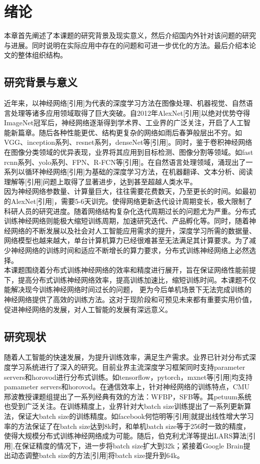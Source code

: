 \chapter{绪论}
本章首先阐述了本课题的研究背景及现实意义，然后介绍国内外针对该问题的研究与进展。同时说明在实际应用中存在的问题和可进一步优化的方法。最后介绍本论文的整体组织结构。
\section{研究背景与意义}
近年来，以神经网络[引用]为代表的深度学习方法在图像处理、机器视觉、自然语言处理等诸多应用领域取得了巨大突破。自2012年AlexNet[引用]以绝对优势夺得ImageNet冠军后，神经网络逐渐得到学术界、工业界的广泛关注，开启了人工智能新篇章。随后各种性能更优、结构更复杂的网络如雨后春笋般层出不穷。如VGG、inception系列、resnet系列，denseNet等[引用]。同时，鉴于卷积神经网络在图像分类领域的优异表现，业界将其应用到目标检测、图像分割等领域。如fast rcnn系列、yolo系列、FPN、R-FCN等[引用]。在自然语言处理领域，涌现出了一系列以循环神经网络[引用]为基础的深度学习方法，在机器翻译、文本分析、阅读理解等[引用]问题上取得了显著进步，达到甚至超越人类水平。\\
因为神经网络参数量、计算量巨大，往往需要花费数天，乃至更长的时间。如最初的AlexNet[引用]，需要5-6天训完。使得网络更新迭代设计周期变长，极大限制了科研人员的研究进度。随着网络结构复杂化迭代周期过长的问题尤为严重。分布式训练神经网络则能极大缩短训练周期，加速研究迭代、产品孵化等。同时，随着神经网络的不断发展以及社会对人工智能应用需求的提升，深度学习所需的数据量、网络模型也越来越大，单台计算机算力已经很难甚至无法满足其计算要求。为了减少神经网络的训练时间和适应不断增长的算力要求，分布式训练神经网络上必然选择。\\
本课题围绕着分布式训练神经网络的效率和精度进行展开，旨在保证网络性能前提下，提高分布式训练神经网络效率，提高训练加速比，缩短训练时间。本课题不仅能解决现今训练神经网络时间过长的问题， 更为今后单机场景下无法完成训练的神经网络提供了高效的训练方法。这对于现阶段和可预见未来都有重要实用价值，促进神经网络的发展，对人工智能的发展有深远意义。

\section{研究现状}
随着人工智能的快速发展，为提升训练效率，满足生产需求。业界已针对分布式深度学习系统进行了深入的研究。目前业界主流深度学习框架同时支持parameter servers和horovod进行分布式训练。如tensorflow，pytorch，mxnet等[引用]均支持pamameter servers和horovod。在通信效率上，针对神经网络的训练特点，CMU邢波教授课题组提出了一系列经典有效的方法：WFBP，SFB等。其petuum系统也受到广泛关注。在训练精度上，业界针对大batch size训练提出了一系列更新算法，保证大batch size的训练精度。如facebook何恺明等[引用]就提出线性增大学习率的方法保证了在batch size达到8k时，和单机batch size等于256时一致的精度，使得大规模分布式训练神经网络成为可能。随后，伯克利尤洋等提出LARS算法[引用],在保证精度的情况下，进一步将batch size扩大到32k；紧接着Google Brain提出动态调整batch size的方法[引用]将batch size提升到64k。
